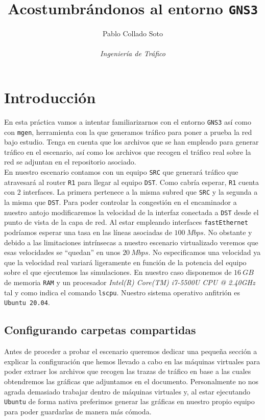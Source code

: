 \documentclass[11pt]{article}
\title{Acostumbrándonos al entorno \texttt{GNS3}}
\author{Pablo Collado Soto \\ \\ \textit{Ingeniería de Tráfico}}
\date{}
\begin{document}
    \maketitle

    \section{Introducción}
        En esta práctica vamos a intentar familiarizarnos con el entorno \texttt{GNS3} así como con \texttt{mgen}, herramienta con la que generamos tráfico para poner a prueba la red bajo estudio. Tenga en cuenta que los archivos que se han empleado para generar tráfico en el escenario, así como los archivos que recogen el tráfico real sobre la red se adjuntan en el repositorio asociado.\\

        En nuestro escenario contamos con un equipo \texttt{SRC} que generará tráfico que atravesará al router \texttt{R1} para llegar al equipo \texttt{DST}. Como cabría esperar, \texttt{R1} cuenta con $2$ interfaces. La primera pertenece a la misma subred que \texttt{SRC} y la segunda a la misma que \texttt{DST}. Para poder controlar la congestión en el encaminador a nuestro antojo modificaremos la velocidad de la interfaz conectada a \texttt{DST} desde el punto de vista de la capa de red. Al estar empleando interfaces \texttt{fastEthernet} podríamos esperar una tasa en las líneas asociadas de $100\ Mbps$. No obstante y debido a las limitaciones intrínsecas a nuestro escenario virtualizado veremos que esas velocidades se ``quedan'' en unos $20\ Mbps$. No especificamos una velocidad ya que la velocidad real variará ligeramente en función de la potencia del equipo sobre el que ejecutemos las simulaciones. En nuestro caso disponemos de $16\ GB$ de memoria \texttt{RAM} y un procesador \textit{Intel(R) Core(TM) i7-5500U CPU @ 2.40GHz} tal y como indica el comando \texttt{lscpu}. Nuestro sistema operativo anfitrión es \texttt{Ubuntu 20.04}.

        \subsection{Configurando carpetas compartidas}
            Antes de proceder a probar el escenario queremos dedicar una pequeña sección a explicar la configuración que hemos llevado a cabo en las máquinas virtuales para poder extraer los archivos que recogen las trazas de tráfico en base a las cuales obtendremos las gráficas que adjuntamos en el documento. Personalmente no nos agrada demasiado trabajar dentro de máquinas virtuales y, al estar ejecutando \texttt{Ubuntu} de forma nativa preferimos generar las gráficas en nuestro propio equipo para poder guardarlas de manera más cómoda.\\
\end{document}
